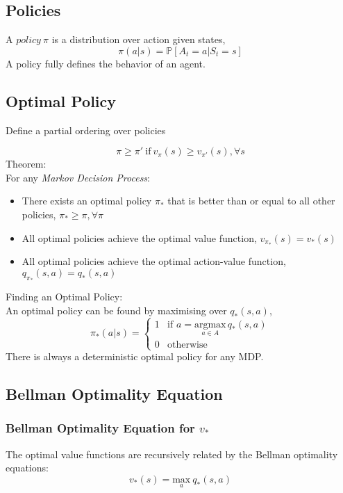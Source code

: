 \documentclass{article}
\begin{document}
\subsection{Policies}
A $policy\ \pi $ is a distribution over action given states,
$$ \pi(a|s) = \mathds{P} [A_t=a | S_t =s]  $$
A policy fully defines the behavior of an agent. 

\subsection{Optimal Policy}
Define a partial ordering over policies

$$ \pi \geq \pi'\ \text{if}\ v_\pi (s) \geq v_{\pi'} (s), \forall s   $$
Theorem: \\
For any \textit{Markov Decision Process}:
\begin{itemize}
    \item There exists an optimal policy $\pi_*$ that is better than or equal to all other policies, $ \pi_* \geq \pi, \forall \pi $
    \item All optimal policies achieve the optimal value function, $v_{\pi_*}(s) = v_*(s)$
    \item All optimal policies achieve the optimal action-value function, $q_{\pi_*}(s,a) = q_*(s,a)  $
\end{itemize}
Finding an Optimal Policy:\\
An optimal policy can be found by maximising over $q_*(s,a)$,
\begin{equation}
  \pi_*(a|s) =
    \begin{cases}
      1 & \text{if  $a = \underset{a \in A}{\mathrm{argmax}}\, q_*(s,a) $}\\
      0 & \text{otherwise}
    \end{cases}       
\end{equation}
There is always a deterministic optimal policy for any MDP.\\
\subsection{Bellman Optimality Equation}
\subsubsection{Bellman Optimality Equation for $v_*$}
The optimal value functions are recursively related by the Bellman optimality equations:
$$ v_*(s) = \underset{a}{\mathrm{max}}\ q_*(s,a) $$
\end{document}
